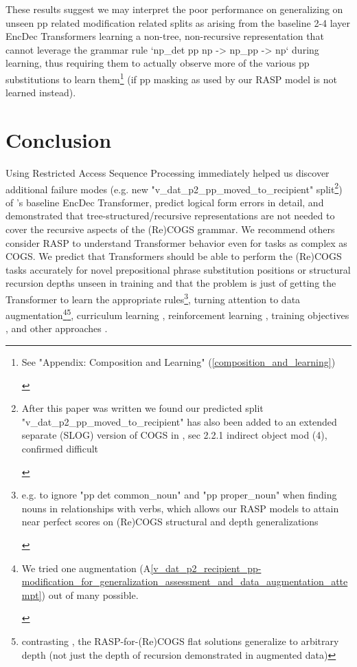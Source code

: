 \documentclass[11pt]{article}
\begin{document}
These results suggest we may interpret the poor performance on generalizing on unseen pp related modification related splits as arising from the baseline 2-4 layer EncDec Transformers learning a non-tree, non-recursive representation that cannot leverage the grammar rule `np\_det pp np -> np\_pp -> np` during learning, thus requiring them to actually observe more of the various pp substitutions to learn them\footnote{\begin{footnotesize}See "Appendix: Composition and Learning" (\ref{composition_and_learning})\end{footnotesize}} (if pp masking as used by our RASP model is not learned instead). \section{Conclusion} Using Restricted Access Sequence Processing immediately helped us discover additional failure modes (e.g. new "v\_dat\_p2\_pp\_moved\_to\_recipient" split\footnote{\begin{footnotesize}After this paper was written we found our predicted split "v\_dat\_p2\_pp\_moved\_to\_recipient" has also been added to an extended separate (SLOG) version of COGS in \cite{li2023slogstructuralgeneralizationbenchmark}, sec 2.2.1 indirect object mod (4), confirmed difficult
\end{footnotesize}
}) of \cite{Wu2023}'s baseline EncDec Transformer, predict logical form errors in detail, and demonstrated that tree-structured/recursive representations are not needed to cover the recursive aspects of the (Re)COGS grammar. We recommend others consider RASP to understand Transformer behavior even for tasks as complex as COGS. We predict that Transformers should be able to perform the (Re)COGS tasks accurately for novel prepositional phrase substitution positions or structural recursion depths unseen in training and that the problem is just of getting the Transformer to learn the appropriate rules\footnote{\begin{footnotesize}e.g. to ignore "pp det common\_noun" and "pp proper\_noun" when finding nouns in relationships with verbs, which allows our RASP models to attain near perfect scores on (Re)COGS structural and depth generalizations\end{footnotesize}}, turning attention to data augmentation\footnote{\begin{footnotesize}We tried one augmentation (A\ref{v_dat_p2_recipient_pp-modification_for_generalization_assessment_and_data_augmentation_attempt}) out of many possible.
\end{footnotesize}}\cite{qiu-etal-2022-improving}\footnote{contrasting \cite{qiu-etal-2022-improving}, the RASP-for-(Re)COGS flat solutions generalize to arbitrary depth (not just the depth of recursion demonstrated in augmented data)}, curriculum learning \cite{10.1145/1553374.1553380}, reinforcement learning \cite{Ranzato2015}, training objectives \cite{10.1162/tacl_a_00733}, and other approaches \cite{Csordas2021} \cite{ontanon-etal-2022-making}.
\end{document}
